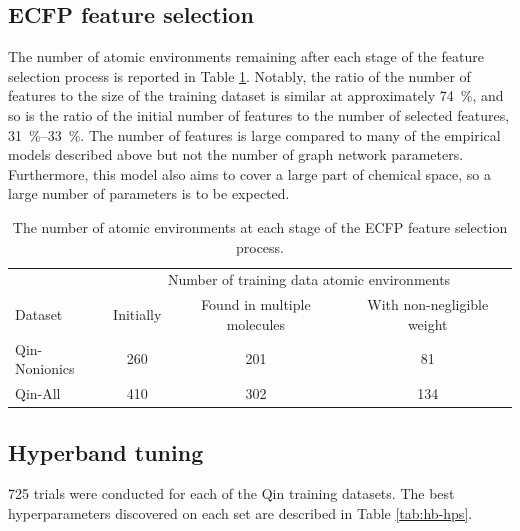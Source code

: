 \subsection{ECFP feature selection}

The number of atomic environments remaining after each stage of the feature selection process is reported in Table \ref{tab:ecfp-fs}. Notably, the ratio of the number of features to the size of the training dataset is similar at
approximately \SI{74}{\%}, and so is the ratio of the initial number of features to the number of selected features, \SIrange{31}{33}{\%}. The number of features is large compared to many of the empirical models described above but not the number of graph network parameters. Furthermore, this model also aims to cover a large part of chemical space, so a large number of parameters is to be expected.

\begin{table}
    \centering
    \caption{The number of atomic environments at each stage of the ECFP feature selection process.}
    \label{tab:ecfp-fs}
    \begin{tabular}{@{}lccc@{}} \toprule
                      & \multicolumn{3}{c}{Number of training data atomic environments}                                                            \\\cmidrule(l){2-4}
        Dataset       & Initially                                                       & Found in multiple molecules & With non-negligible weight \\\midrule
        Qin-Nonionics & 260                                                             & 201                         & 81                         \\
        Qin-All       & 410                                                             & 302                         & 134                        \\\bottomrule
    \end{tabular}
\end{table}

\subsection{Hyperband tuning}

\num{725} trials were conducted for each of the Qin training datasets. The best
hyperparameters discovered on each set are described in Table \ref{tab:hb-hps}.

